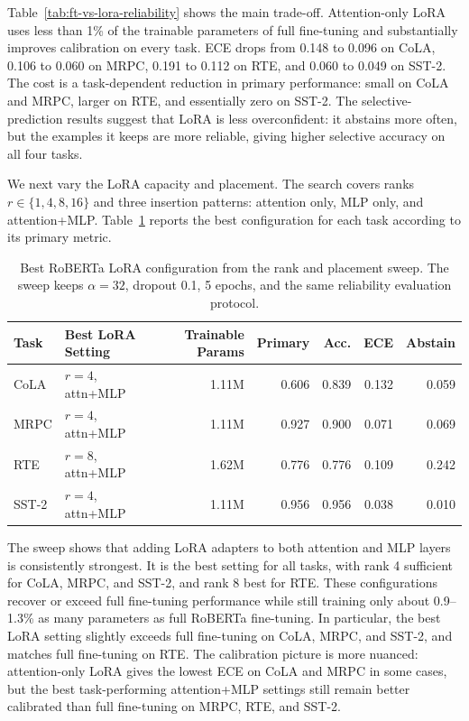 Table~\ref{tab:ft-vs-lora-reliability} shows the main trade-off. Attention-only LoRA uses less than 1\% of the trainable parameters of full fine-tuning and substantially improves calibration on every task. ECE drops from 0.148 to 0.096 on CoLA, 0.106 to 0.060 on MRPC, 0.191 to 0.112 on RTE, and 0.060 to 0.049 on SST-2. The cost is a task-dependent reduction in primary performance: small on CoLA and MRPC, larger on RTE, and essentially zero on SST-2. The selective-prediction results suggest that LoRA is less overconfident: it abstains more often, but the examples it keeps are more reliable, giving higher selective accuracy on all four tasks.

We next vary the LoRA capacity and placement. The search covers ranks $r\in\{1,4,8,16\}$ and three insertion patterns: attention only, MLP only, and attention+MLP. Table~\ref{tab:lora-setting-search} reports the best configuration for each task according to its primary metric.

\begin{table}[t]
\centering
\small
\begin{tabular}{llrrrrr}
\toprule
Task & Best LoRA Setting & Trainable Params & Primary & Acc. & ECE & Abstain \\
\midrule
CoLA & $r=4$, attn+MLP & 1.11M & 0.606 & 0.839 & 0.132 & 0.059 \\
MRPC & $r=4$, attn+MLP & 1.11M & 0.927 & 0.900 & 0.071 & 0.069 \\
RTE & $r=8$, attn+MLP & 1.62M & 0.776 & 0.776 & 0.109 & 0.242 \\
SST-2 & $r=4$, attn+MLP & 1.11M & 0.956 & 0.956 & 0.038 & 0.010 \\
\bottomrule
\end{tabular}
\caption{Best RoBERTa LoRA configuration from the rank and placement sweep. The sweep keeps $\alpha=32$, dropout 0.1, 5 epochs, and the same reliability evaluation protocol.}
\label{tab:lora-setting-search}
\end{table}

The sweep shows that adding LoRA adapters to both attention and MLP layers is consistently strongest. It is the best setting for all tasks, with rank 4 sufficient for CoLA, MRPC, and SST-2, and rank 8 best for RTE. These configurations recover or exceed full fine-tuning performance while still training only about 0.9--1.3\% as many parameters as full RoBERTa fine-tuning. In particular, the best LoRA setting slightly exceeds full fine-tuning on CoLA, MRPC, and SST-2, and matches full fine-tuning on RTE. The calibration picture is more nuanced: attention-only LoRA gives the lowest ECE on CoLA and MRPC in some cases, but the best task-performing attention+MLP settings still remain better calibrated than full fine-tuning on MRPC, RTE, and SST-2.

